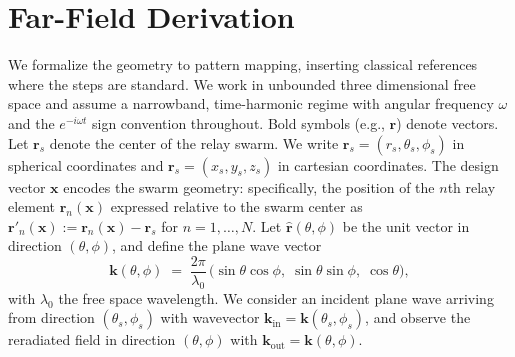 \documentclass[11pt,letterpaper]{article}
\theoremstyle{definition}
\theoremstyle{plain}
\begin{document}
   

\section{Far-Field Derivation}

We formalize the geometry to pattern mapping, inserting classical references where the steps are standard. We work in unbounded three dimensional free space and assume a narrowband, time-harmonic regime with angular frequency $\omega$ and the $e^{-i\omega t}$ sign convention throughout. Bold symbols (e.g., $\mathbf{r}$) denote vectors. Let $\mathbf{r}_s$ denote the center of the relay swarm. We write $ \mathbf{r}_s = (r_s, \theta_s, \phi_s) $ in spherical coordinates and $\mathbf{r}_s = (x_s, y_s, z_s)$ in cartesian coordinates. The design vector $\mathbf{x}$ encodes the swarm geometry: specifically, the position of the $n$th relay element $\mathbf{r}_n(\mathbf{x})$ expressed relative to the swarm center as $\mathbf{r}'_n(\mathbf{x}) := \mathbf{r}_n(\mathbf{x}) - \mathbf{r}_s$ for $n = 1,\dots,N$. Let $\hat{\mathbf{r}}(\theta,\phi)$ be the unit vector in direction $(\theta,\phi)$, and define the plane wave vector
\[
\mathbf{k}(\theta,\phi) \;=\; \frac{2\pi}{\lambda_0}\,
\big(\sin\theta\cos\phi,\; \sin\theta\sin\phi,\; \cos\theta\big),
\]
with $\lambda_0$ the free space wavelength. We consider an incident plane wave arriving from direction $(\theta_s,\phi_s)$ with wavevector $\mathbf{k}_{\mathrm{in}} = \mathbf{k}(\theta_s,\phi_s)$, and observe the reradiated field in direction $(\theta,\phi)$ with $\mathbf{k}_{\mathrm{out}} = \mathbf{k}(\theta,\phi)$.
\end{document}
